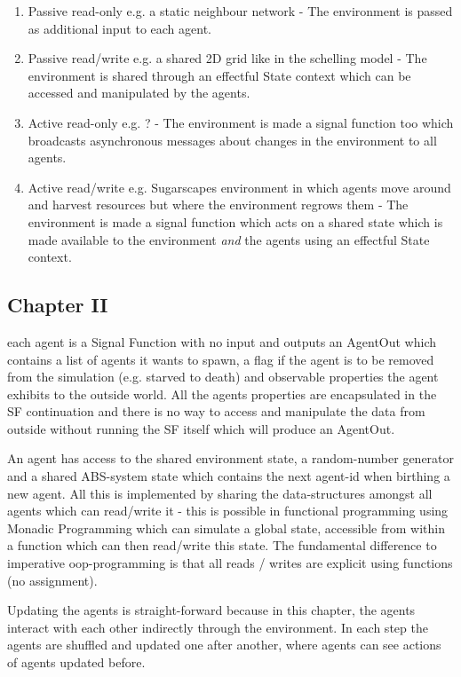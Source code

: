 \begin{enumerate}
	\item Passive read-only e.g. a static neighbour network - The environment is passed as additional input to each agent.
	\item Passive read/write e.g. a shared 2D grid like in the schelling model \cite{schelling_dynamic_1971} - The environment is shared through an effectful State context which can be accessed and manipulated by the agents.
	\item Active read-only e.g. ? - The environment is made a signal function too which broadcasts asynchronous messages about changes in the environment to all agents.
	\item Active read/write e.g. Sugarscapes environment in which agents move around and harvest resources but where the environment regrows them - The environment is made a signal function which acts on a shared state which is made available to the environment \textit{and} the agents using an effectful State context.
\end{enumerate}


\subsection{Chapter II}
each agent is a Signal Function with no input and outputs an AgentOut which contains a list of agents it wants to spawn, a flag if the agent is to be removed from the simulation (e.g. starved to death) and observable properties the agent exhibits to the outside world. All the agents properties are encapsulated in the SF continuation and there is no way to access and manipulate the data from outside without running the SF itself which will produce an AgentOut.

An agent has access to the shared environment state, a random-number generator and a shared ABS-system state which contains the next agent-id when birthing a new agent. All this is implemented by sharing the data-structures amongst all agents which can read/write it - this is possible in functional programming using Monadic Programming which can simulate a global state, accessible from within a function which can then read/write this state. The fundamental difference to imperative oop-programming is that all reads / writes are explicit using functions (no assignment).

Updating the agents is straight-forward because in this chapter, the agents interact with each other indirectly through the environment. In each step the agents are shuffled and updated one after another, where agents can see actions of agents updated before. 

